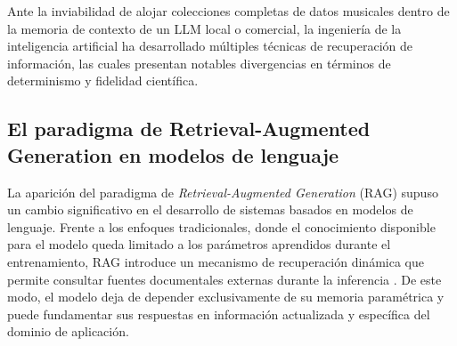 Ante la inviabilidad de alojar colecciones completas de datos musicales dentro de la memoria de contexto de un LLM local o comercial, la ingeniería de la inteligencia artificial ha desarrollado múltiples técnicas de recuperación de información, las cuales presentan notables divergencias en términos de determinismo y fidelidad científica.

\subsection{El paradigma de Retrieval-Augmented Generation en modelos de lenguaje}


La aparición del paradigma de \textit{Retrieval-Augmented Generation} (RAG) supuso un cambio significativo en el desarrollo de sistemas basados en modelos de lenguaje. Frente a los enfoques tradicionales, donde el conocimiento disponible para el modelo queda limitado a los parámetros aprendidos durante el entrenamiento, RAG introduce un mecanismo de recuperación dinámica que permite consultar fuentes documentales externas durante la inferencia \citep{lewis2020retrieval}. De este modo, el modelo deja de depender exclusivamente de su memoria paramétrica y puede fundamentar sus respuestas en información actualizada y específica del dominio de aplicación.

